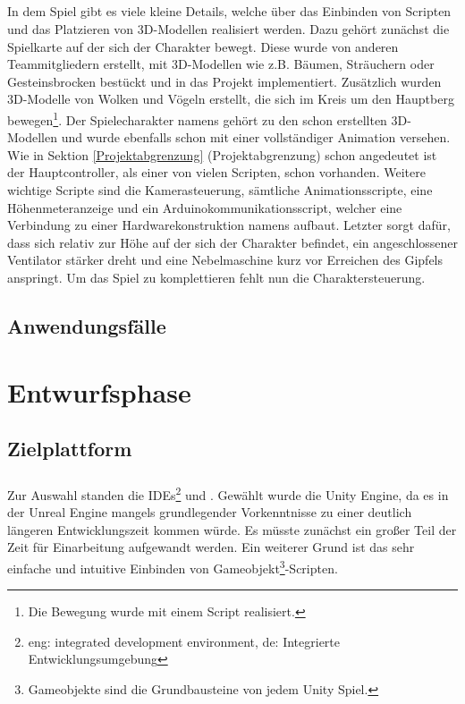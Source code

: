 \paragraph{}
In dem Spiel gibt es viele kleine Details, welche über das Einbinden von Scripten und das Platzieren von 3D-Modellen realisiert werden. Dazu gehört zunächst die Spielkarte auf der sich der Charakter bewegt. Diese wurde von anderen Teammitgliedern erstellt, mit 3D-Modellen wie z.B. Bäumen, Sträuchern oder Gesteinsbrocken bestückt und in das Projekt implementiert. Zusätzlich wurden 3D-Modelle von Wolken und Vögeln erstellt, die sich im Kreis um den Hauptberg bewegen\footnote{Die Bewegung wurde mit einem Script realisiert.}.
Der Spielecharakter namens  gehört zu den schon erstellten 3D-Modellen und wurde ebenfalls schon mit einer vollständiger Animation versehen.
Wie in Sektion \ref{Projektabgrenzung} (Projektabgrenzung) schon angedeutet ist der Hauptcontroller, als einer von vielen Scripten, schon vorhanden. Weitere wichtige Scripte sind die Kamerasteuerung, sämtliche Animationsscripte, eine Höhenmeteranzeige und ein Arduinokommunikationsscript, welcher eine Verbindung zu einer Hardwarekonstruktion namens  aufbaut. Letzter sorgt dafür, dass sich relativ zur Höhe auf der sich der Charakter befindet, ein angeschlossener Ventilator stärker dreht und eine Nebelmaschine kurz vor Erreichen des Gipfels anspringt.
Um das Spiel zu komplettieren fehlt nun die Charaktersteuerung. 
\section{Anwendungsfälle}


\chapter{Entwurfsphase}
\section{Zielplattform}
\paragraph{}
Zur Auswahl standen die IDEs\footnote{eng: integrated development environment, de: Integrierte Entwicklungsumgebung}  und . Gewählt wurde die Unity Engine, da es in der Unreal Engine mangels grundlegender Vorkenntnisse zu einer deutlich längeren Entwicklungszeit kommen würde. Es müsste zunächst ein großer Teil der Zeit für Einarbeitung aufgewandt werden. 
Ein weiterer Grund ist das sehr einfache und intuitive Einbinden von Gameobjekt\footnote{Gameobjekte sind die Grundbausteine von jedem Unity Spiel.}-Scripten.

